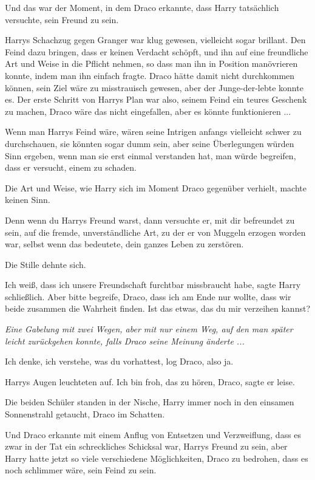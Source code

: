 Und das war der Moment, in dem Draco erkannte, dass Harry tatsächlich versuchte,
sein Freund zu sein.

Harrys Schachzug gegen Granger war klug gewesen, vielleicht sogar brillant. Den
Feind dazu bringen, dass er keinen Verdacht schöpft, und ihn auf eine
freundliche Art und Weise in die Pflicht nehmen, so dass man ihn in Position
manövrieren konnte, indem man ihn einfach fragte. Draco hätte damit nicht
durchkommen können, sein Ziel wäre zu misstrauisch gewesen, aber der
Junge-der-lebte konnte es. Der erste Schritt von Harrys Plan war also, seinem
Feind ein teures Geschenk zu machen, Draco wäre das nicht eingefallen, aber es
könnte funktionieren ...

Wenn man Harrys Feind wäre, wären seine Intrigen anfangs vielleicht schwer zu
durchschauen, sie könnten sogar dumm sein, aber seine Überlegungen würden Sinn
ergeben, wenn man sie erst einmal verstanden hat, man würde begreifen, dass er
versucht, einem zu schaden.

Die Art und Weise, wie Harry sich im Moment Draco gegenüber verhielt, machte
keinen Sinn.

Denn wenn du Harrys Freund warst, dann versuchte er, mit dir befreundet zu sein,
auf die fremde, unverständliche Art, zu der er von Muggeln erzogen worden war,
selbst wenn das bedeutete, dein ganzes Leben zu zerstören.

Die Stille dehnte sich.

\glqq{}Ich weiß, dass ich unsere Freundschaft furchtbar missbraucht habe\grqq{},
sagte Harry schließlich. \glqq{}Aber bitte begreife, Draco, dass ich am Ende nur
wollte, dass wir beide zusammen die Wahrheit finden. Ist das etwas, das du mir
verzeihen kannst?\grqq{}

\emph{Eine Gabelung mit zwei Wegen, aber mit nur einem Weg, auf den man später
leicht zurückgehen konnte, falls Draco seine Meinung änderte ...}

\glqq{}Ich denke, ich verstehe, was du vorhattest\grqq{}, log Draco, \glqq{}also
ja.\grqq{}

Harrys Augen leuchteten auf. \glqq{}Ich bin froh, das zu hören, Draco\grqq{},
sagte er leise.

Die beiden Schüler standen in der Nische, Harry immer noch in den einsamen
Sonnenstrahl getaucht, Draco im Schatten.

Und Draco erkannte mit einem Anflug von Entsetzen und Verzweiflung, dass es zwar
in der Tat ein schreckliches Schicksal war, Harrys Freund zu sein, aber Harry
hatte jetzt so viele verschiedene Möglichkeiten, Draco zu bedrohen, dass es noch
schlimmer wäre, sein Feind zu sein.

